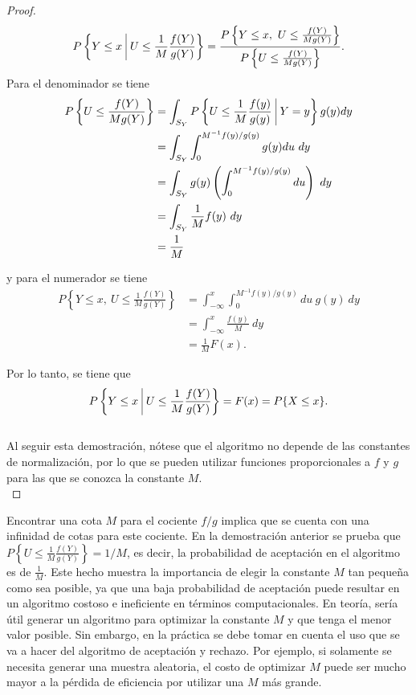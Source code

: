 \documentclass[11pt,a4paper]{article}
\begin{document}
\begin{proof}
$$P\left\lbrace Y \leq x \  \vline \ U\leq \frac{1}{M}\frac{f(Y)}{g(Y)}\right\rbrace = \frac{P\left\lbrace Y\leq x, \ U \leq \frac{f(Y)}{Mg(Y)}\right\rbrace}{P\left\lbrace U \leq \frac{f(Y)}{Mg(Y)}\right\rbrace}.$$ Para el denominador se tiene 
\begin{align*}
P\left\lbrace U \leq \frac{f(Y)}{Mg(Y)}\right\rbrace &= \int_{S_Y}P\left\lbrace U \leq \frac{1}{M}\frac{f(y)}{g(y)} \ \vline \ Y=y\right\rbrace g(y) dy\\
&= \int_{S_Y}\int_0^{M^{-1} f(y)/g(y)} g(y)du \ dy\\
&= \int_{S_Y}g(y)\left(\int_0^{M^{-1} f(y)/g(y)} du\right)\ dy\\
&= \int_{S_Y}\frac{1}{M}f(y) \ dy\\
&= \frac{1}{M}
\end{align*}

y para el numerador se tiene
\begin{align*}
P\left\lbrace Y \leq x, \ U \leq \frac{1}{M}\frac{f(Y)}{g(Y)}\right\rbrace &= \int_{-\infty}^x\int_0^{M^{-1} f(y)/g(y)} du \ g(y) \ dy\\
&= \int_{-\infty}^x \frac{f(y)}{M} \ dy\\
&= \frac{1}{M} F(x).
\end{align*}

Por lo tanto, se tiene que $$P\left\lbrace Y \leq x \  \vline \ U\leq \frac{1}{M}\frac{f(Y)}{g(Y)}\right\rbrace = F(x) = P\{X \leq x\}.$$\\

Al seguir esta demostración, nótese que el algoritmo no depende de las constantes de normalización, por lo que se pueden utilizar funciones proporcionales a $f$ y $g$ para las que se conozca la constante $M$.\\
\end{proof}

Encontrar una cota $M$ para el cociente $f/g$ implica que se cuenta con una infinidad de cotas para este cociente. En la demostración anterior se prueba que $P\left\lbrace U \leq \frac{1}{M}\frac{f(Y)}{g(Y)}\right\rbrace = 1/M$, es decir, la probabilidad de aceptación en el algoritmo es de $\frac{1}{M}$. Este hecho muestra la importancia de elegir la constante $M$ tan pequeña como sea posible, ya que una baja probabilidad de aceptación puede resultar en un algoritmo costoso e ineficiente en términos computacionales. En teoría, sería útil generar un algoritmo para optimizar la constante $M$ y que tenga el menor valor posible. Sin embargo, en la práctica se debe tomar en cuenta el uso que se va a hacer del algoritmo de aceptación y rechazo. Por ejemplo, si solamente se necesita generar una muestra aleatoria, el costo de optimizar $M$ puede ser mucho mayor a la pérdida de eficiencia por utilizar una $M$ más grande.\\
\end{document}
